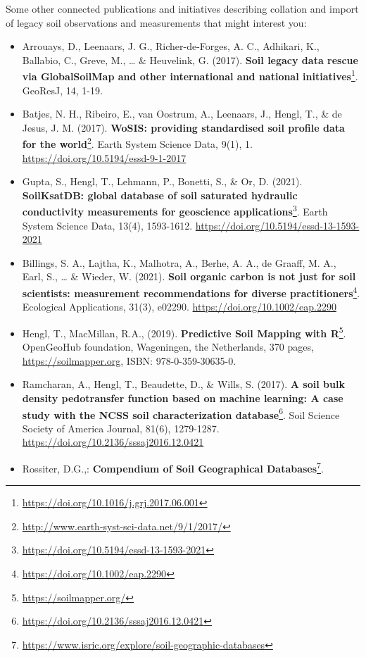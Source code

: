 \documentclass[
  graybox,natbib,nospthms]{svmono}
\providecommand{\tightlist}{%
  \setlength{\itemsep}{0pt}\setlength{\parskip}{0pt}}
\providecommand{\tightlist}{\setlength{\itemsep}{0pt}\setlength{\parskip}{0pt}}
\renewcommand{\href}[2]{#2 (\url{#1})}
\renewcommand{\href}[2]{#2\footnote{\url{#1}}}
\begin{document}
Some other connected publications and initiatives describing collation
and import of legacy soil observations and measurements that might interest
you:

\begin{itemize}
\tightlist
\item
  Arrouays, D., Leenaars, J. G., Richer-de-Forges, A. C., Adhikari,
  K., Ballabio, C., Greve, M., \ldots{} \& Heuvelink, G. (2017). \href{https://doi.org/10.1016/j.grj.2017.06.001}{\textbf{Soil
  legacy data rescue via GlobalSoilMap and other international and
  national initiatives}}.
  GeoResJ, 14, 1-19.\\
\item
  Batjes, N. H., Ribeiro, E., van Oostrum, A., Leenaars, J., Hengl,
  T., \& de Jesus, J. M. (2017). \href{http://www.earth-syst-sci-data.net/9/1/2017/}{\textbf{WoSIS: providing standardised soil
  profile data for the world}}. Earth System Science Data, 9(1), 1. \url{https://doi.org/10.5194/essd-9-1-2017}~
\item
  Gupta, S., Hengl, T., Lehmann, P., Bonetti, S., \& Or, D. (2021). \href{https://doi.org/10.5194/essd-13-1593-2021}{\textbf{SoilKsatDB:
  global database of soil saturated hydraulic conductivity measurements for
  geoscience applications}}. Earth System Science Data, 13(4), 1593-1612.
  \url{https://doi.org/10.5194/essd-13-1593-2021}\\
\item
  Billings, S. A., Lajtha, K., Malhotra, A., Berhe, A. A., de Graaff, M. A.,
  Earl, S., \ldots{} \& Wieder, W. (2021). \href{https://doi.org/10.1002/eap.2290}{\textbf{Soil organic carbon is not just for soil
  scientists: measurement recommendations for diverse practitioners}}. Ecological
  Applications, 31(3), e02290. \url{https://doi.org/10.1002/eap.2290}\\
\item
  Hengl, T., MacMillan, R.A., (2019). \href{https://soilmapper.org/}{\textbf{Predictive Soil Mapping with
  R}}. OpenGeoHub foundation, Wageningen, the
  Netherlands, 370 pages, \url{https://soilmapper.org}, ISBN:
  978-0-359-30635-0.\\
\item
  Ramcharan, A., Hengl, T., Beaudette, D., \& Wills, S. (2017). \href{https://doi.org/10.2136/sssaj2016.12.0421}{\textbf{A soil
  bulk density pedotransfer function based on machine learning: A case
  study with the NCSS soil characterization
  database}}. Soil Science
  Society of America Journal, 81(6), 1279-1287.
  \url{https://doi.org/10.2136/sssaj2016.12.0421}
\item
  Rossiter, D.G.,: \href{https://www.isric.org/explore/soil-geographic-databases}{\textbf{Compendium of Soil Geographical
  Databases}}.
\end{itemize}
\end{document}
